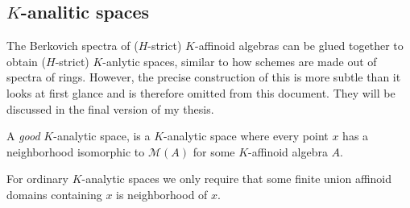 \subsection{$K$-analitic spaces} \label{sec:k_analitic_spaces}

The Berkovich spectra of ($H$-strict) $K$-affinoid algebras can be glued together to obtain ($H$-strict) $K$-anlytic spaces, similar to how schemes are made out of spectra of rings. 
However, the precise construction of this is more subtle than it looks at first glance and is therefore omitted from this document. 
They will be discussed in the final version of my thesis. 

A \emph{good} $K $-analytic space, is a $K$-analytic space where every point $x$ has a neighborhood isomorphic to $\mathcal{M} (A)$ for some $K$-affinoid algebra $A$. 

For ordinary $K$-analytic spaces we only require that some finite union affinoid domains containing $x$ is neighborhood of $x$. 




